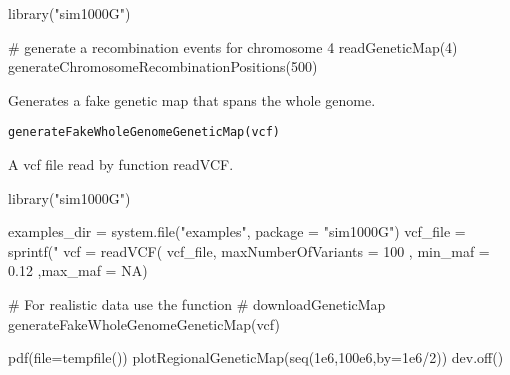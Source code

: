 \documentclass[letterpaper]{book}
\begin{document}
%
\begin{Examples}
\begin{ExampleCode}

library("sim1000G")

# generate a recombination events for chromosome 4
readGeneticMap(4)
generateChromosomeRecombinationPositions(500)

\end{ExampleCode}
\end{Examples}
%
\begin{Description}\relax
Generates a fake genetic map that spans the whole genome.
\end{Description}
%
\begin{Usage}
\begin{verbatim}
generateFakeWholeGenomeGeneticMap(vcf)
\end{verbatim}
\end{Usage}
%
\begin{Arguments}
\begin{ldescription}
\item[\code{vcf}] A vcf file read by function readVCF.
\end{ldescription}
\end{Arguments}
%
\begin{Examples}
\begin{ExampleCode}

library("sim1000G")

examples_dir = system.file("examples", package = "sim1000G")
vcf_file = sprintf("%
vcf = readVCF( vcf_file, maxNumberOfVariants = 100 ,
               min_maf = 0.12 ,max_maf = NA)

# For realistic data use the function
# downloadGeneticMap
generateFakeWholeGenomeGeneticMap(vcf)

pdf(file=tempfile())
plotRegionalGeneticMap(seq(1e6,100e6,by=1e6/2))
dev.off()

\end{ExampleCode}
\end{Examples}
\end{document}
